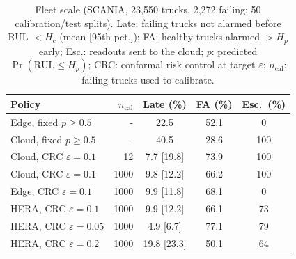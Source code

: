 \begin{table}[t]
\centering
\caption{Fleet scale (SCANIA, 23{,}550 trucks, 2{,}272 failing; 50 calibration/test splits). Late: failing trucks not alarmed before RUL $<H_c$ (mean [95th pct.]); FA: healthy trucks alarmed $>H_p$ early; Esc.: readouts sent to the cloud; $p$: predicted $\Pr(\mathrm{RUL}\le H_p)$; CRC: conformal risk control at target $\varepsilon$; $n_{\mathrm{cal}}$: failing trucks used to calibrate.}
\label{tab:fleet}
\footnotesize\setlength{\tabcolsep}{2.2pt}
\begin{tabular}{lrccc}
\toprule
Policy & $n_{\mathrm{cal}}$ & Late (\%) & FA (\%) & Esc.\ (\%) \\
\midrule
Edge, fixed $p{\ge}0.5$ & - & 22.5 & 52.1 & 0 \\
Cloud, fixed $p{\ge}0.5$ & - & 40.5 & 28.6 & 100 \\
\midrule
Cloud, CRC $\varepsilon{=}0.1$ & 12 & 7.7 [19.8] & 73.9 & 100 \\
\midrule
Cloud, CRC $\varepsilon{=}0.1$ & 1000 & 9.8 [12.2] & 66.2 & 100 \\
Edge, CRC $\varepsilon{=}0.1$ & 1000 & 9.9 [11.8] & 68.1 & 0 \\
HERA, CRC $\varepsilon{=}0.1$ & 1000 & 9.9 [12.2] & 66.1 & 73 \\
HERA, CRC $\varepsilon{=}0.05$ & 1000 & 4.9 [6.7] & 77.1 & 79 \\
HERA, CRC $\varepsilon{=}0.2$ & 1000 & 19.8 [23.3] & 50.1 & 64 \\
\bottomrule
\end{tabular}
\end{table}
